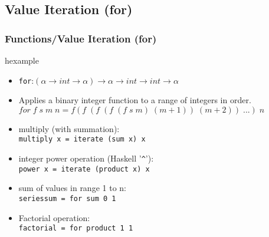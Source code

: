 \subsection{Value Iteration (for)}
\begin{frame}
\frametitle{Functions/Value Iteration (for)}
\begin{beamercolorbox}{hexample}
\codeforH
\end{beamercolorbox}
\begin{itemize}
 \item \texttt{for}:$(\alpha \rightarrow int \rightarrow \alpha) \rightarrow \alpha \rightarrow int  \rightarrow  int \rightarrow \alpha$
 \item Applies a binary integer function to a range of integers in order.\\
 $for\;f\;s\;m\;n = f(f\;(f\;(f\;(f\;s\;m)\;(m+1))\;(m+2))\;...)\;n$
\end{itemize}
\end{frame}

\begin{frame}
 \begin{itemize}
  \item multiply (with summation):\\
\texttt{multiply x = iterate (sum x) x}
  \item integer power operation (Haskell '\lstinline{^}'):\\
\texttt{power x = iterate (product x) x}
  \item sum of values in range 1 to  n:\\
\texttt{seriessum = for sum 0 1}
  \item Factorial operation:\\
\texttt{factorial = for product 1 1}
 \end{itemize}
\end{frame}


